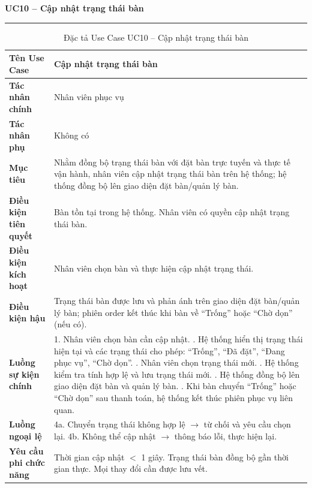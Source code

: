 ﻿\documentclass[../DoAn.tex]{subfiles}
\newcommand{\UCtitle}[1]{%
    \vspace{0.5em}
    {\large\bfseries #1}\\[-0.5em]
    \rule{\textwidth}{0.5pt}
    \vspace{0.3em}
}
\begin{document}
\begin{table}[H]
\UCtitle{UC10 – Cập nhật trạng thái bàn}
\centering
\begin{tabular}{|p{4cm}|p{10.2cm}|}
\hline
\textbf{Tên Use Case} & Cập nhật trạng thái bàn \\ \hline
\textbf{Tác nhân chính} & Nhân viên phục vụ \\ \hline
\textbf{Tác nhân phụ} & Không có \\ \hline
\textbf{Mục tiêu} &
Nhằm đồng bộ trạng thái bàn với đặt bàn trực tuyến và thực tế vận hành, nhân viên cập nhật trạng thái bàn trên hệ thống; hệ thống đồng bộ lên giao diện đặt bàn/quản lý bàn.
\\ \hline
\textbf{Điều kiện tiên quyết} &
Bàn tồn tại trong hệ thống. Nhân viên có quyền cập nhật trạng thái bàn.
\\ \hline
\textbf{Điều kiện kích hoạt} & Nhân viên chọn bàn và thực hiện cập nhật trạng thái. \\ \hline
\textbf{Điều kiện hậu} &
Trạng thái bàn được lưu và phản ánh trên giao diện đặt bàn/quản lý bàn; phiên order kết thúc khi bàn về ``Trống'' hoặc ``Chờ dọn'' (nếu có).
\\ \hline
\textbf{Luồng sự kiện chính} &
1. Nhân viên chọn bàn cần cập nhật. \newline
2. Hệ thống hiển thị trạng thái hiện tại và các trạng thái cho phép: ``Trống'', ``Đã đặt'', ``Đang phục vụ'', ``Chờ dọn''. \newline
3. Nhân viên chọn trạng thái mới. \newline
4. Hệ thống kiểm tra tính hợp lệ và lưu trạng thái mới. \newline
5. Hệ thống đồng bộ lên giao diện đặt bàn và quản lý bàn. \newline
6. Khi bàn chuyển ``Trống'' hoặc ``Chờ dọn'' sau thanh toán, hệ thống kết thúc phiên phục vụ liên quan.
\\ \hline
\textbf{Luồng ngoại lệ} &
4a. Chuyển trạng thái không hợp lệ $\rightarrow$ từ chối và yêu cầu chọn lại. \newline
4b. Không thể cập nhật $\rightarrow$ thông báo lỗi, thực hiện lại.
\\ \hline
\textbf{Yêu cầu phi chức năng} &
Thời gian cập nhật $<$ 1 giây. Trạng thái bàn đồng bộ gần thời gian thực. Mọi thay đổi cần được lưu vết.
\\ \hline
\end{tabular}
\caption{Đặc tả Use Case UC10 – Cập nhật trạng thái bàn}
\end{table}
\end{document}
